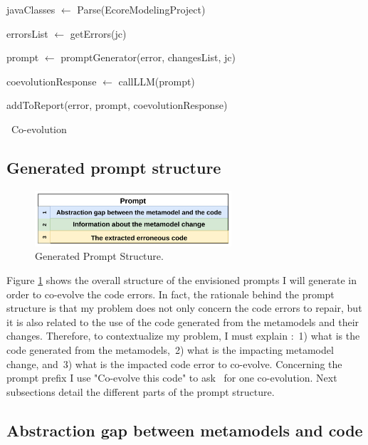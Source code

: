 \begin{algorithm}[t]
	\small
	\SetAlgoLined
	javaClasses $\leftarrow$ Parse(EcoreModelingProject)
	
	{
		errorsList $\leftarrow $ getErrors(jc)
		
		{
			prompt $\leftarrow$ promptGenerator(error, changesList, jc)
			
			coevolutionResponse $\leftarrow$ callLLM(prompt)
			
			addToReport(error, prompt, coevolutionResponse)
		}
	}
	
	
	\caption{\LLM~Co-evolution}
	\label{algo:overallalgo}
\end{algorithm}

\subsection{Generated prompt structure}

\begin{figure}[t]
	\centering
	\includegraphics[width=0.65\textwidth]{./pics/chapter3pics/promptTemplate.png}
	\caption{Generated Prompt Structure.}
	\label{fig:promptstructure}
	\vspace{-5mm}
\end{figure}

Figure \ref{fig:promptstructure} shows the overall structure of the envisioned prompts I will generate in order to co-evolve the code errors. In fact, the rationale behind the prompt structure is that my problem does not only concern the code errors to repair, but it is also related to the use of the code generated from the metamodels and their changes. Therefore, to contextualize my problem, I must explain :~1) what is the code generated from the metamodels,~2) what is the impacting metamodel change, and~3) what is the impacted code error to co-evolve.  Concerning the prompt prefix I use "Co-evolve this code" to ask \LLM~for one co-evolution. Next subsections detail the different parts of the prompt structure. 

\subsection{Abstraction gap between metamodels and code}

